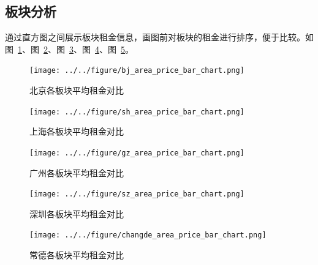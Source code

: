 \subsection{板块分析}
通过直方图之间展示板块租金信息，画图前对板块的租金进行排序，便于比较。如图~\ref{fig:bj_area_price_bar_chart}、图~\ref{fig:sh_area_price_bar_chart}、图~\ref{fig:gz_area_price_bar_chart}、图~\ref{fig:sz_area_price_bar_chart}、图~\ref{fig:changde_area_price_bar_chart}。
\begin{figure}[htbp]
    \centering
    \texttt{[image: ../../figure/bj\_area\_price\_bar\_chart.png]}
    \caption{北京各板块平均租金对比}
    \label{fig:bj_area_price_bar_chart}
\end{figure}
\begin{figure}[htbp]
    \centering
    \texttt{[image: ../../figure/sh\_area\_price\_bar\_chart.png]}
    \caption{上海各板块平均租金对比}
    \label{fig:sh_area_price_bar_chart}
\end{figure}
\begin{figure}[htbp]
    \centering
    \texttt{[image: ../../figure/gz\_area\_price\_bar\_chart.png]}
    \caption{广州各板块平均租金对比}
    \label{fig:gz_area_price_bar_chart}
\end{figure}
\begin{figure}[htbp]
    \centering
    \texttt{[image: ../../figure/sz\_area\_price\_bar\_chart.png]}
    \caption{深圳各板块平均租金对比}
    \label{fig:sz_area_price_bar_chart}
\end{figure}
\begin{figure}
    \centering
    \texttt{[image: ../../figure/changde\_area\_price\_bar\_chart.png]}
    \caption{常德各板块平均租金对比}
    \label{fig:changde_area_price_bar_chart}
\end{figure}


